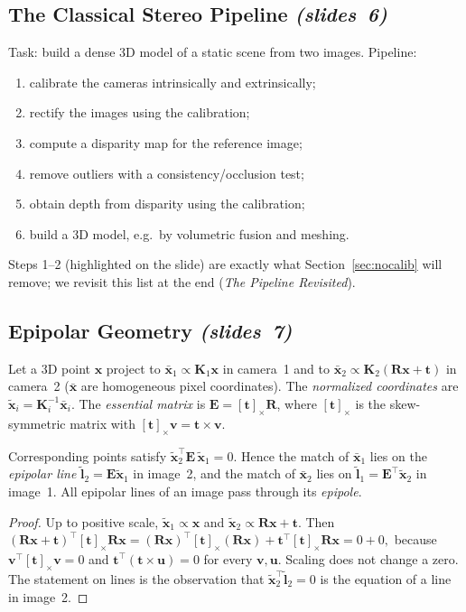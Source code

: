 \documentclass[11pt,a4paper]{article}
\newcommand{\slr}[1]{\texorpdfstring{\emph{(slides~#1)}}{(slides #1)}}
\newcommand{\vx}{\bm{x}}
\newcommand{\vt}{\bm{t}}
\newcommand{\xb}{\bar{\bm{x}}}
\newcommand{\xt}{\tilde{\bm{x}}}
\newcommand{\E}{\bm{E}}
\newcommand{\R}{\bm{R}}
\newcommand{\K}{\bm{K}}
\theoremstyle{definition}
\begin{document}
\subsection{The Classical Stereo Pipeline \slr{6}}
Task: build a dense 3D model of a static scene from two images. Pipeline:
\begin{enumerate}
\item calibrate the cameras intrinsically and extrinsically;
\item rectify the images using the calibration;
\item compute a disparity map for the reference image;
\item remove outliers with a consistency/occlusion test;
\item obtain depth from disparity using the calibration;
\item build a 3D model, e.g.\ by volumetric fusion and meshing.
\end{enumerate}
Steps 1--2 (highlighted on the slide) are exactly what Section~\ref{sec:nocalib} will remove; we revisit this list at the end (\emph{The Pipeline Revisited}).

\subsection{Epipolar Geometry \slr{7}}
\begin{Definition}
Let a 3D point $\vx$ project to $\xb_1\propto \K_1\vx$ in camera~1 and to $\xb_2\propto\K_2(\R\vx+\vt)$ in camera~2 ($\xb$ are homogeneous pixel coordinates). The \emph{normalized coordinates} are $\xt_i=\K_i^{-1}\xb_i$. The \emph{essential matrix} is $\E=[\vt]_\times\R$, where $[\vt]_\times$ is the skew-symmetric matrix with $[\vt]_\times\bm v=\vt\times\bm v$.
\end{Definition}

\begin{Proposition}\label{prop:epi}
Corresponding points satisfy $\xt_2^{\top}\E\,\xt_1=0$. Hence the match of $\xb_1$ lies on the \emph{epipolar line} $\tilde{\bm l}_2=\E\xt_1$ in image~2, and the match of $\xb_2$ lies on $\tilde{\bm l}_1=\E^{\top}\xt_2$ in image~1. All epipolar lines of an image pass through its \emph{epipole}.
\end{Proposition}
\begin{proof}
Up to positive scale, $\xt_1\propto\vx$ and $\xt_2\propto\R\vx+\vt$. Then
$(\R\vx+\vt)^{\top}[\vt]_\times\R\vx=(\R\vx)^{\top}[\vt]_\times(\R\vx)+\vt^{\top}[\vt]_\times\R\vx=0+0,$
because $\bm v^{\top}[\vt]_\times\bm v=0$ and $\vt^{\top}(\vt\times\bm u)=0$ for every $\bm v,\bm u$. Scaling does not change a zero. The statement on lines is the observation that $\xt_2^{\top}\tilde{\bm l}_2=0$ is the equation of a line in image~2.
\end{proof}
\end{document}
